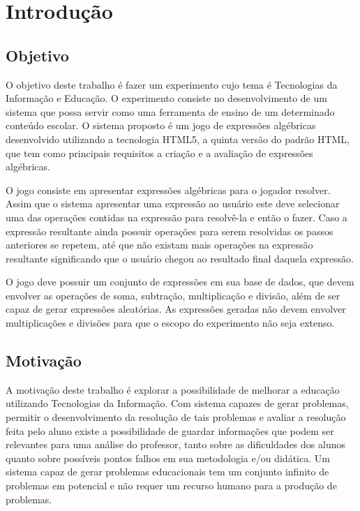 \chapter*[Introdução]{Introdução}

\section{Objetivo}
O objetivo deste trabalho é fazer um experimento cujo tema é Tecnologias da Informação e Educação. O experimento consiste no desenvolvimento de um sistema que possa servir como uma ferramenta de ensino de um determinado conteúdo escolar. O sistema proposto é um jogo de expressões algébricas desenvolvido utilizando a tecnologia HTML5, a quinta versão do padrão HTML, que tem como principais requisitos a criação e a avaliação de expressões algébricas.

	O jogo consiste em apresentar expressões algébricas para o jogador resolver.
Assim que o sistema apresentar uma expressão ao usuário este deve selecionar uma das operações contidas na expressão para resolvê-la e então o fazer. Caso a expressão resultante ainda possuir operações para serem resolvidas os passos anteriores se repetem, até que não existam mais operações na expressão resultante significando que o usuário chegou ao resultado final daquela expressão.

	O jogo deve possuir um conjunto de expressões em sua base de dados, que devem envolver as operações de soma, subtração, multiplicação e divisão, além de ser capaz de gerar expressões aleatórias. As expressões geradas não devem envolver multiplicações e divisões para que o escopo do experimento não seja extenso.

\section{Motivação}
A motivação deste trabalho é explorar a possibilidade de melhorar a educação utilizando Tecnologias da Informação. Com sistema capazes de gerar problemas, permitir o desenvolvimento da resolução de tais problemas e avaliar a resolução feita pelo aluno existe a possibilidade de guardar informações que podem ser relevantes para uma análise do professor, tanto sobre as dificuldades dos alunos quanto sobre possíveis pontos falhos em sua metodologia e/ou didática. Um sistema capaz de gerar problemas educacionais tem um conjunto infinito de problemas em potencial e não requer um recurso humano para a produção de problemas.
	
